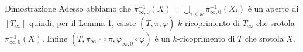 \documentclass[aspectratio=43]{beamer}
\begin{document}
\begin{frame}{Dimostrazione}
  Adesso abbiamo che \(\pi^{-1}_{\infty, 0}(X) = \bigcup_{i<\omega} \pi^{-1}_{\infty, 0}(X_i)\) è un aperto di \([T_\infty]\) quindi, per il Lemma 1, esiste \((\tilde{T}, \pi, \varphi)\) \(k\)-ricoprimento di \(T_\infty\) che srotola \(\pi^{-1}_{\infty, 0}(X)\).
  Infine \((\tilde{T}, \pi_{\infty, 0} \circ \pi, \varphi_{\infty, 0} \circ \varphi)\) è un \(k\)-ricoprimento di \(T\) che srotola \(X\).
  \begin{flushright}
    \qedsymbol
  \end{flushright}
\end{frame}
\end{document}
